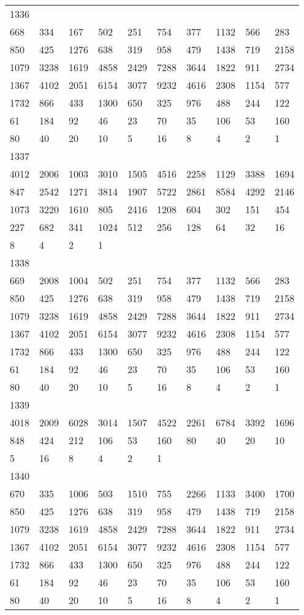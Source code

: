 \begin{longtable}{*{10}{l}}
1336&&&&&&&&&\\
668& 334& 167& 502& 251& 754& 377& 1132& 566& 283\\
850& 425& 1276& 638& 319& 958& 479& 1438& 719& 2158\\
1079& 3238& 1619& 4858& 2429& 7288& 3644& 1822& 911& 2734\\
1367& 4102& 2051& 6154& 3077& 9232& 4616& 2308& 1154& 577\\
1732& 866& 433& 1300& 650& 325& 976& 488& 244& 122\\
61& 184& 92& 46& 23& 70& 35& 106& 53& 160\\
80& 40& 20& 10& 5& 16& 8& 4& 2& 1\\

1337&&&&&&&&&\\
4012& 2006& 1003& 3010& 1505& 4516& 2258& 1129& 3388& 1694\\
847& 2542& 1271& 3814& 1907& 5722& 2861& 8584& 4292& 2146\\
1073& 3220& 1610& 805& 2416& 1208& 604& 302& 151& 454\\
227& 682& 341& 1024& 512& 256& 128& 64& 32& 16\\
8& 4& 2& 1& \\

1338&&&&&&&&&\\
669& 2008& 1004& 502& 251& 754& 377& 1132& 566& 283\\
850& 425& 1276& 638& 319& 958& 479& 1438& 719& 2158\\
1079& 3238& 1619& 4858& 2429& 7288& 3644& 1822& 911& 2734\\
1367& 4102& 2051& 6154& 3077& 9232& 4616& 2308& 1154& 577\\
1732& 866& 433& 1300& 650& 325& 976& 488& 244& 122\\
61& 184& 92& 46& 23& 70& 35& 106& 53& 160\\
80& 40& 20& 10& 5& 16& 8& 4& 2& 1\\

1339&&&&&&&&&\\
4018& 2009& 6028& 3014& 1507& 4522& 2261& 6784& 3392& 1696\\
848& 424& 212& 106& 53& 160& 80& 40& 20& 10\\
5& 16& 8& 4& 2& 1& \\

1340&&&&&&&&&\\
670& 335& 1006& 503& 1510& 755& 2266& 1133& 3400& 1700\\
850& 425& 1276& 638& 319& 958& 479& 1438& 719& 2158\\
1079& 3238& 1619& 4858& 2429& 7288& 3644& 1822& 911& 2734\\
1367& 4102& 2051& 6154& 3077& 9232& 4616& 2308& 1154& 577\\
1732& 866& 433& 1300& 650& 325& 976& 488& 244& 122\\
61& 184& 92& 46& 23& 70& 35& 106& 53& 160\\
80& 40& 20& 10& 5& 16& 8& 4& 2& 1\\


\end{longtable}

